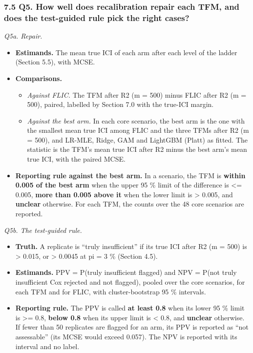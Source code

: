 \documentclass[
  10pt,
]{article}
\providecommand{\tightlist}{%
  \setlength{\itemsep}{0pt}\setlength{\parskip}{0pt}}
\begin{document}
\subsubsection{7.5 Q5. How well does recalibration repair
each TFM, and does the test-guided rule pick the right
cases?}\label{q5.-how-well-does-recalibration-repair-each-tfm-and-does-the-test-guided-rule-pick-the-right-cases}

\emph{Q5a. Repair.}

\begin{itemize}
\tightlist
\item
  \textbf{Estimands.} The mean true ICI of each arm after
  each level of the ladder (Section 5.5), with MCSE.
\item
  \textbf{Comparisons.}

  \begin{itemize}
  \tightlist
  \item
    \emph{Against FLIC.} The TFM after R2 (m = 500) minus
    FLIC after R2 (m = 500), paired, labelled by Section 7.0
    with the true-ICI margin.
  \item
    \emph{Against the best arm.} In each core scenario, the
    best arm is the one with the smallest mean true ICI
    among FLIC and the three TFMs after R2 (m = 500), and
    LR-MLE, Ridge, GAM and LightGBM (Platt) as fitted. The
    statistic is the TFM's mean true ICI after R2 minus the
    best arm's mean true ICI, with the paired MCSE.
  \end{itemize}
\item
  \textbf{Reporting rule against the best arm.} In a
  scenario, the TFM is \textbf{within 0.005 of the best arm}
  when the upper 95 \% limit of the difference is \textless=
  0.005, \textbf{more than 0.005 above it} when the lower
  limit is \textgreater{} 0.005, and \textbf{unclear}
  otherwise. For each TFM, the counts over the 48 core
  scenarios are reported.
\end{itemize}

\emph{Q5b. The test-guided rule.}

\begin{itemize}
\tightlist
\item
  \textbf{Truth.} A replicate is ``truly insufficient'' if
  its true ICI after R2 (m = 500) is \textgreater{} 0.015,
  or \textgreater{} 0.0045 at pi = 3 \% (Section 4.5).
\item
  \textbf{Estimands.} PPV = P(truly insufficient \textbar{}
  flagged) and NPV = P(not truly insufficient \textbar{} Cox
  rejected and not flagged), pooled over the core scenarios,
  for each TFM and for FLIC, with cluster-bootstrap 95 \%
  intervals.
\item
  \textbf{Reporting rule.} The PPV is called \textbf{at
  least 0.8} when its lower 95 \% limit is \textgreater=
  0.8, \textbf{below 0.8} when its upper limit is
  \textless{} 0.8, and \textbf{unclear} otherwise. If fewer
  than 50 replicates are flagged for an arm, its PPV is
  reported as ``not assessable'' (its MCSE would exceed
  0.057). The NPV is reported with its interval and no
  label.
\end{itemize}
\end{document}
